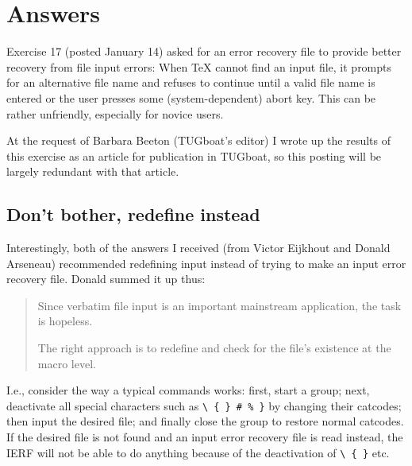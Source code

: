 \section{Answers}

\begin{comment}
[The TUGboat article mentioned below appeared as [info not yet
available--18-Aug-1994]]

Date: 17 Mar 1994 13:04:36 -0500 (EST)
From: Michael Downes <MJD@MATH.AMS.ORG>
Subject: Around the Bend #17, answers
To: info-tex@shsu.edu
X-ListName: TeX-Related Network Discussion List <INFO-TeX@SHSU.edu>
\end{comment}


Exercise 17 (posted January 14) asked for an error recovery file to
provide better recovery from file input errors: When TeX cannot find an
input file, it prompts for an alternative file name and refuses to
continue until a valid file name is entered or the user presses some
(system-dependent) abort key. This can be rather unfriendly, especially
for novice users.

At the request of Barbara Beeton (TUGboat's editor) 
I wrote up the
results of this exercise as an article for publication in TUGboat, so
this posting will be largely redundant with that article.


\subsection{Don't bother, redefine  instead}

Interestingly, both of the answers I received 
(from Victor Eijkhout and 
Donald Arseneau) recommended redefining input 
instead of trying to
make an input error recovery file. Donald summed it up thus:
\begin{quotation}
 Since verbatim file input is an important mainstream application,
 the task is hopeless.
 
 The right approach is to redefine \cmd{} and check for the file's
 existence at the macro level.
\end{quotation}

I.e., consider the way a typical \cmd{\verbfile} commands works: first, start
a group; next, deactivate all special characters such as \verb?\ { } # % }? by
changing their catcodes; then input the desired file; and finally close
the group to restore normal catcodes. If the desired file is not found
and an input error recovery file is read instead, the IERF will not be
able to do anything because of the deactivation of \verb?\ { }? etc.


